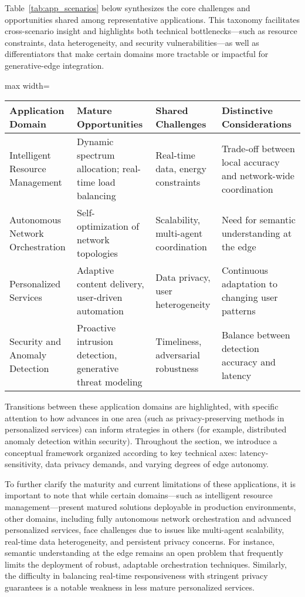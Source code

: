 \documentclass[sigconf]{acmart}
\begin{document}
Table~\ref{tab:app_scenarios} below synthesizes the core challenges and opportunities shared among representative applications. This taxonomy facilitates cross-scenario insight and highlights both technical bottlenecks—such as resource constraints, data heterogeneity, and security vulnerabilities—as well as differentiators that make certain domains more tractable or impactful for generative-edge integration.

\begin{table*}[htbp]
\centering
\caption{Synthesis of Application Scenarios for Generative AI and Edge Intelligence: Common Challenges and Opportunities}
\label{tab:app_scenarios}
\begin{adjustbox}{max width=\textwidth}
\begin{tabular}{@{}llll@{}}
\toprule
Application Domain & Mature Opportunities & Shared Challenges & Distinctive Considerations \\
\midrule
Intelligent Resource Management & Dynamic spectrum allocation; real-time load balancing & Real-time data, energy constraints & Trade-off between local accuracy and network-wide coordination \\
Autonomous Network Orchestration & Self-optimization of network topologies & Scalability, multi-agent coordination & Need for semantic understanding at the edge \\
Personalized Services & Adaptive content delivery, user-driven automation & Data privacy, user heterogeneity & Continuous adaptation to changing user patterns \\
Security and Anomaly Detection & Proactive intrusion detection, generative threat modeling & Timeliness, adversarial robustness & Balance between detection accuracy and latency \\
\bottomrule
\end{tabular}
\end{adjustbox}
\end{table*}

Transitions between these application domains are highlighted, with specific attention to how advances in one area (such as privacy-preserving methods in personalized services) can inform strategies in others (for example, distributed anomaly detection within security). Throughout the section, we introduce a conceptual framework organized according to key technical axes: latency-sensitivity, data privacy demands, and varying degrees of edge autonomy.

To further clarify the maturity and current limitations of these applications, it is important to note that while certain domains—such as intelligent resource management—present matured solutions deployable in production environments, other domains, including fully autonomous network orchestration and advanced personalized services, face challenges due to issues like multi-agent scalability, real-time data heterogeneity, and persistent privacy concerns. For instance, semantic understanding at the edge remains an open problem that frequently limits the deployment of robust, adaptable orchestration techniques. Similarly, the difficulty in balancing real-time responsiveness with stringent privacy guarantees is a notable weakness in less mature personalized services.
\end{document}
